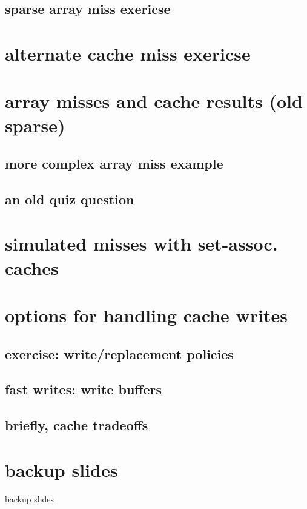 \subsection{sparse array miss exericse}


\section{alternate cache miss exericse}


\section{array misses and cache results (old sparse)}


\subsection{more complex array miss example}


\subsection{an old quiz question}


\section{simulated misses with set-assoc. caches}


\section{options for handling cache writes}


\subsection{exercise: write/replacement policies}


\subsection{fast writes: write buffers}


\subsection{briefly, cache tradeoffs}


\section{backup slides}
\begin{frame}{backup slides}
\end{frame}


